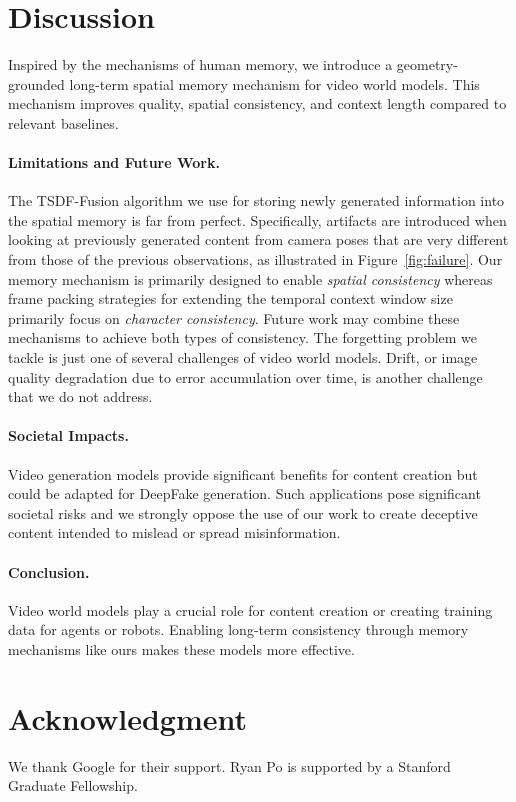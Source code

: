 \section{Discussion}

Inspired by the mechanisms of human memory, we introduce a geometry-grounded long-term spatial memory mechanism for video world models. This mechanism improves quality, spatial consistency, and context length compared to relevant baselines. 

\paragraph{Limitations and Future Work.} The TSDF-Fusion algorithm we use for storing newly generated information into the spatial memory is far from perfect. Specifically, artifacts are introduced when looking at previously generated content from camera poses that are very different from those of the previous observations, as illustrated in Figure~\ref{fig:failure}. Our memory mechanism is primarily designed to enable \emph{spatial consistency} whereas frame packing strategies for extending the temporal context window size~\cite{Zhang2025PackingIF} primarily focus on \emph{character consistency}. Future work may combine these mechanisms to achieve both types of consistency. The forgetting problem we tackle is just one of several challenges of video world models. Drift, or image quality degradation due to error accumulation over time, is another challenge that we do not address.

\paragraph{Societal Impacts.} Video generation models provide significant benefits for content creation but could be adapted for DeepFake generation. Such applications pose significant societal risks and we strongly oppose the use of our work to create deceptive content intended to mislead or spread misinformation.

\paragraph{Conclusion.} Video world models play a crucial role for content creation or creating training data for agents or robots. Enabling long-term consistency through memory mechanisms like ours makes these models more effective.

\section{Acknowledgment}
We thank Google for their support. Ryan Po is supported by a Stanford Graduate Fellowship.